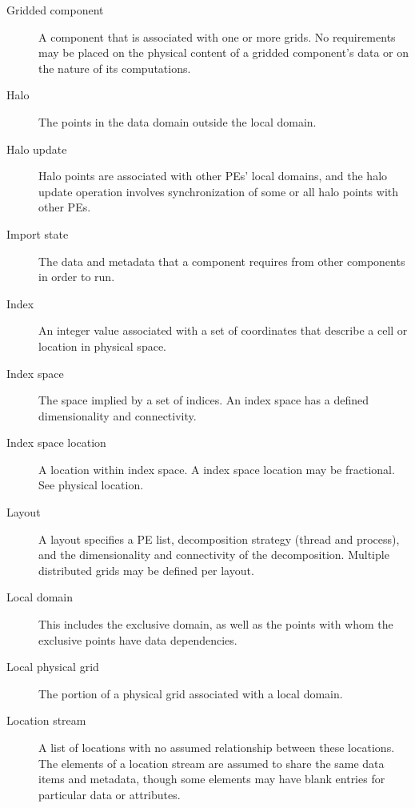 \begin{description}
\item[Gridded component] \label{glos:GridComp}
  A component that is associated with one or more grids.  No requirements 
  may be placed on the physical content of a gridded component's data or 
  on the nature of its computations. 

\item[Halo] \label{glos:Halo} 
  The points in the data domain outside the local domain. 

\item[Halo update] \label{glos:HaloUpdate}
  Halo points are associated with other PEs'
  local domains, and the halo update operation involves
  synchronization of some or all halo points with other PEs. 

\item[Import state] \label{glos:ImportState} The data and metadata 
  that a component requires from other components in order to run.  

\item[Index] \label{glos:Index} An integer value associated with a set
  of coordinates that describe a cell or location in physical space.

\item[Index space] \label{glos:IndexSpace} The space implied 
  by a set of indices.  An index space has a defined dimensionality and 
  connectivity.

\item[Index space location] \label{glos:IndexSpaceloc} 
  A location within index space.  A index space location may be fractional.
  See physical location.

\item[Layout] \label{glos:Layout} A layout specifies a PE list, 
  decomposition strategy (thread and process), and the dimensionality 
  and connectivity of the decomposition.  Multiple distributed 
  grids may be defined per layout.

\item[Local domain] \label{glos:LocalDomain} This includes the exclusive 
  domain, as well as the points with whom the exclusive points have data 
  dependencies.

\item[Local physical grid] \label{glos:LocPhysGrid} The portion of a 
  physical grid associated with a local domain.  

\item[Location stream] \label{glos:LocStream} A list of
  locations with no assumed relationship between these locations.  The
  elements of a location stream are assumed to share the same data
  items and metadata, though some elements may have blank entries for
  particular data or attributes.


\end{description}
